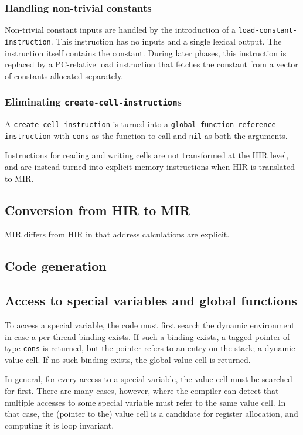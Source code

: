 \subsubsection{Handling non-trivial constants}

Non-trivial constant inputs are handled by the introduction of a
\texttt{load-constant-instruction}.  This instruction has no inputs
and a single lexical output.  The instruction itself contains the
constant.  During later phases, this instruction is replaced by a
PC-relative load instruction that fetches the constant from a vector
of constants allocated separately.

\subsubsection{Eliminating \texttt{create-cell-instruction}s}

A \texttt{create-cell-instruction} is turned into a
\texttt{global-function-reference-instruction} with \texttt{cons} as
the function to call and \texttt{nil} as both the arguments.

Instructions for reading and writing cells are not transformed at the
HIR level, and are instead turned into explicit memory instructions
when HIR is translated to MIR.

\subsection{Conversion from HIR to MIR}

MIR differs from HIR in that address calculations are explicit.

\subsection{Code generation}

\subsection{Access to special variables and global functions}

To access a special variable, the code must first search the dynamic
environment in case a per-thread binding exists.  If such a binding
exists, a tagged pointer of type \texttt{cons} is returned, but the
pointer refers to an entry on the stack; a dynamic value cell.  If no
such binding exists, the global value cell is returned.

In general, for every access to a special variable, the value cell
must be searched for first.  There are many cases, however, where the
compiler can detect that multiple accesses to some special variable
must refer to the same value cell.  In that case, the (pointer to the)
value cell is a candidate for register allocation, and computing it is
loop invariant.

